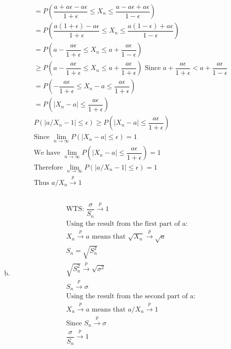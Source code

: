 \documentclass{article}
\begin{document}
\begin{flushleft}
\begin{enumerate}[(a)]
\begin{multline*}
=P\left(\dfrac{a+a\epsilon-a\epsilon}{1+\epsilon}\leq X_n\leq \dfrac{a-a\epsilon+a\epsilon}{1-\epsilon}\right)\\
=P\left(\dfrac{a(1+\epsilon)-a\epsilon}{1+\epsilon}\leq X_n\leq \dfrac{a(1-\epsilon)+a\epsilon}{1-\epsilon}\right)\\
=P\left(a-\dfrac{a\epsilon}{1+\epsilon}\leq X_n\leq a+\dfrac{a\epsilon}{1-\epsilon}\right)\\
\geq P\left(a-\dfrac{a\epsilon}{1+\epsilon}\leq X_n\leq a+\dfrac{a\epsilon}{1+\epsilon}\right) \text{ Since } a+\dfrac{a\epsilon}{1+\epsilon}<a+\dfrac{a\epsilon}{1-\epsilon}\\
=P\left(-\dfrac{a\epsilon}{1+\epsilon}\leq X_n-a\leq \dfrac{a\epsilon}{1+\epsilon}\right)\\
=P\left(|X_n-a|\leq \dfrac{a\epsilon}{1+\epsilon} \right)\\
P(|a/X_n-1|\leq\epsilon)\geq P\left(|X_n-a|\leq \dfrac{a\epsilon}{1+\epsilon} \right)\\
\text{Since } \lim_{n\to \infty}P\left(|X_n-a|\leq \epsilon \right)=1\\
\text{We have }\lim_{n\to \infty}P\left(|X_n-a|\leq \dfrac{a\epsilon}{1+\epsilon} \right)=1\\
\text{Therefore } \lim_{n\to \infty}P(|a/X_n-1|\leq\epsilon)=1\\
\text{Thus } a/X_n \overset{p}{\to} 1\\
\end{multline*}
	\item 
\begin{multline*}\\
\text{WTS: } \dfrac{\sigma}{S_n}\overset{p}{\to} 1\\
\text{Using the result from the first part of a:}\\
X_n\overset{p}{\to} a \text{ means that }
\sqrt{X_n}\overset{p}{\to} \sqrt{a}\\
S_n=\sqrt{S_n^2}\\
\sqrt{S_n^2}\overset{p}{\to} \sqrt{\sigma^2}\\
S_n\overset{p}{\to} \sigma\\
\text{Using the result from the second part of a:}\\
X_n\overset{p}{\to} a \text{ means that } a/X_n\overset{p}{\to} 1\\
\text{Since } S_n\overset{p}{\to} \sigma\\
\dfrac{\sigma}{S_n}\overset{p}{\to} 1\\
\end{multline*}


\end{enumerate}
\end{flushleft}
\end{document}
